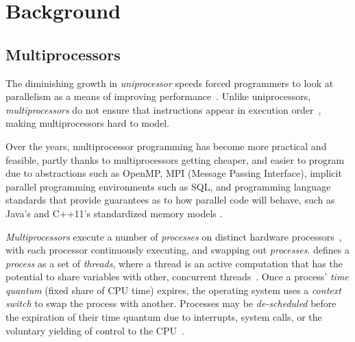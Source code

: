 \chapter{Background}


\section{Multiprocessors}
The diminishing growth in \emph{uniprocessor} speeds
forced programmers to look at parallelism as a means of improving
performance~\citep{cantrill2008real}. Unlike uniprocessors, \emph{multiprocessors} do
not ensure that instructions appear in execution order~\cite{scott2013shared},
making multiprocessors hard to model.


Over the years, multiprocessor programming has become more practical and
feasible, partly thanks to multiprocessors getting cheaper, and
easier to program due to abstractions such as OpenMP, MPI (Message Passing
Interface), implicit parallel programming environments such as SQL, and
programming language standards that provide guarantees as to how parallel code will
behave, such as Java's\citep{javamemorymodel2014} and C++11's
\citep{cppmemorymodel} standardized memory models
\citep[Chapter~2.2]{perfbook2021}.

\emph{Multiprocessors} execute a number of \emph{processes} on distinct
hardware processors~\citep[Appendix~B.2]{herlihy2020art}, with each processor
continuously executing, and swapping out \emph{processes}.
\citeauthor{scott2013shared} defines a \emph{process} as a set of
\emph{threads}, where a thread is an active computation that has the potential
to share variables with other, concurrent threads~\citep[p.6]{scott2013shared}.
Once a process' \emph{time quantum} (fixed share of CPU time) expires, the operating system
uses a \emph{context switch} to swap the process with another. Processes
may be \emph{de-scheduled} before the expiration of their time quantum due to interrupts,
system calls, or the voluntary yielding of control to the CPU~\citep[Section~3.2.3]{osconcepts2021}.

